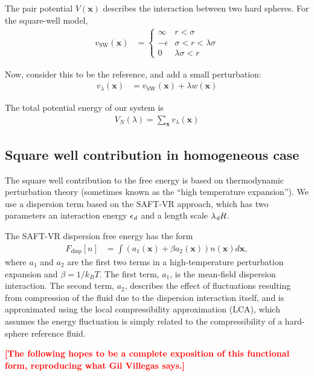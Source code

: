 \documentclass[letterpaper,twocolumn,amsmath,amssymb,pre,aps,10pt]{revtex4-1}
\newcommand\xx{\mathbf{x}}
\newcommand\rr{\mathbf{x}}
\newcommand\fixme[1]{\textcolor{red}{\textbf{[#1]}}}
\begin{document}
The pair potential $V(\rr)$ describes the interaction between two hard spheres. For the square-well model,
\begin{align}
  v_\text{SW}(\rr) &=
    \begin{cases}
      \infty & r < \sigma \\
      -\epsilon & \sigma < r < \lambda\sigma \\
      0 & \lambda\sigma < r
    \end{cases}
\end{align}

Now, consider this to be the reference, and add a small perturbation:
\begin{align}
  v_\lambda(\rr) &= v_\text{SW}(\rr) + \lambda w(\rr)
\end{align}

The total potential energy of our system is
\begin{align}
  V_N(\lambda) = \sum_\rr v_\lambda(\rr)
\end{align}



\subsection{Square well contribution in homogeneous case}
The square well contribution to the free energy is based on
thermodynamic perturbation theory (sometimes known as the ``high
temperature expansion'').  We use a dispersion term based on the
SAFT-VR approach\cite{gil-villegas-1997-SAFT-VR}, which has two
parameters an interaction energy $\epsilon_\textit{d}$ and a length scale
$\lambda_\textit{d} R$.

The SAFT-VR dispersion free energy has the form~\cite{gil-villegas-1997-SAFT-VR}
\begin{align}
  F_\text{disp}[n] &= \int \left(a_1(\xx) + \beta a_2(\xx)\right)n(\xx)d\xx,
\end{align}
where $a_1$ and $a_2$ are the first two terms in a high-temperature
perturbation expansion and $\beta=1/k_BT$.  The first term, $a_1$, is
the mean-field dispersion interaction. The second term, $a_2$, describes the
effect of fluctuations resulting from compression of the fluid due
to the dispersion interaction itself, and is approximated
using the local compressibility approximation (LCA), which
assumes the energy fluctuation is simply related to the
compressibility of a hard-sphere reference fluid\cite{barker1976liquid}.

\fixme{The following hopes to be a complete exposition of this functional form,
  reproducing what Gil Villegas says.}
\end{document}
